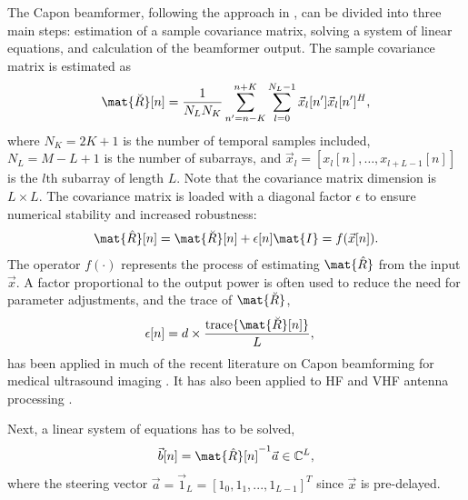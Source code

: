 The Capon beamformer, following the approach in \cite{Synnevag2009}, can be divided into three main steps: estimation of a sample covariance matrix, solving a system of linear equations, and calculation of the beamformer output.  The sample covariance matrix is estimated as 
%
\begin{align}
\mat{\breve{R}}[n] = \frac{1}{N_LN_K}\sum_{n'=n-K}^{n+K} \sum_{l=0}^{N_L-1} \vec{x}_l[n']\vec{x}_l[n']^H,\label{II_eq:R}
\end{align}
%
where  $N_K = 2K + 1$ is the number of temporal samples included, $N_L = M-L+1$ is the number of subarrays, and $\vec{x}_l = [x_l[n], \dotso, x_{l+L-1}[n]]$ is the $l\text{th}$ subarray of length $L$. Note that the covariance matrix dimension is $L \times L$. The covariance matrix is loaded with a diagonal factor $\epsilon$ to ensure numerical stability and increased robustness:
%
\begin{align}\label{II_eq:diag}
\mat{\hat{R}}[n] = \mat{\breve{R}}[n] + \epsilon[n]\mat{I} = f(\vec{x}[n]).
\end{align}
%
The operator $f(\cdot)$ represents the process of estimating $\mat{\hat{R}}$ from the input $\vec{x}$.
A factor proportional to the output power is often used to reduce the need for parameter adjustments, and the trace of $\mat{\breve{R}}$, 
%
\begin{align}\label{II_eq:diag_adapt}
\epsilon[n] &= d \times \frac{\text{trace}\{\mat{\breve{R}}[n]\}}{L},
\end{align}
%
has been applied in much of the recent literature on Capon beamforming for medical ultrasound imaging \cite{Synnevag2007, Nilsen2009, Wang2009, Mehdizadeh2012}. It has also been applied to HF and VHF antenna processing \cite{Featherstone1997b}.

Next, a linear system of equations has to be solved,
%
\begin{align}\label{II_eq:b}
\vec{b}[n] = \mat{\hat{R}}[n]^{-1}\vec{a} \in \mathbb{C}^L,
\end{align}
%
where the steering vector $\vec{a} = \vec{1}_L = [1_0, 1_1, ..., 1_{L-1}]^T$ since $\vec{x}$ is pre-delayed. 

